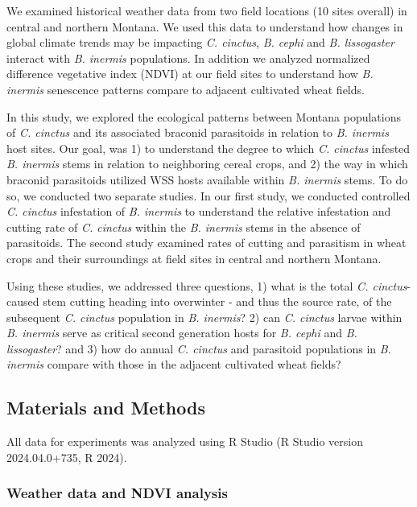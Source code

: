 \documentclass[
]{article}
\begin{document}
We examined historical weather data from two field locations (10 sites
overall) in central and northern Montana. We used this data to
understand how changes in global climate trends may be impacting
\emph{C. cinctus}, \emph{B. cephi} and \emph{B. lissogaster} interact
with \emph{B. inermis} populations. In addition we analyzed normalized
difference vegetative index (NDVI) at our field sites to understand how
\emph{B. inermis} senescence patterns compare to adjacent cultivated
wheat fields.

In this study, we explored the ecological patterns between Montana
populations of \emph{C. cinctus} and its associated braconid parasitoids
in relation to \emph{B. inermis} host sites. Our goal, was 1) to
understand the degree to which \emph{C. cinctus} infested \emph{B.
inermis} stems in relation to neighboring cereal crops, and 2) the way
in which braconid parasitoids utilized WSS hosts available within
\emph{B. inermis} stems. To do so, we conducted two separate studies. In
our first study, we conducted controlled \emph{C. cinctus} infestation
of \emph{B. inermis} to understand the relative infestation and cutting
rate of \emph{C. cinctus} within the \emph{B. inermis} stems in the
absence of parasitoids. The second study examined rates of cutting and
parasitism in wheat crops and their surroundings at field sites in
central and northern Montana.

Using these studies, we addressed three questions, 1) what is the total
\emph{C. cinctus}-caused stem cutting heading into overwinter - and thus
the source rate, of the subsequent \emph{C. cinctus} population in
\emph{B. inermis}? 2) can \emph{C. cinctus} larvae within \emph{B.
inermis} serve as critical second generation hosts for \emph{B. cephi}
and \emph{B. lissogaster}? and 3) how do annual \emph{C. cinctus} and
parasitoid populations in \emph{B. inermis} compare with those in the
adjacent cultivated wheat fields?

\subsection{Materials and Methods}\label{materials-and-methods}

All data for experiments was analyzed using R Studio (R Studio version
2024.04.0+735, R 2024).

\subsubsection{Weather data and NDVI
analysis}\label{weather-data-and-ndvi-analysis}
\end{document}
